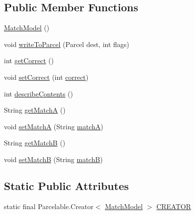 \subsection*{Public Member Functions}
\begin{DoxyCompactItemize}
\item 
\hyperlink{classorg_1_1buildmlearn_1_1matchtemplate_1_1data_1_1MatchModel_a924aa9108269f905b49e1062c271a757}{Match\+Model} ()
\item 
void \hyperlink{classorg_1_1buildmlearn_1_1matchtemplate_1_1data_1_1MatchModel_a55e6b262f93f6feee4596b56d324976b}{write\+To\+Parcel} (Parcel dest, int flags)
\item 
int \hyperlink{classorg_1_1buildmlearn_1_1matchtemplate_1_1data_1_1MatchModel_a46b17ddb418c16a7450d8ccfa88325f1}{get\+Correct} ()
\item 
void \hyperlink{classorg_1_1buildmlearn_1_1matchtemplate_1_1data_1_1MatchModel_a52e181ce05dffffc6b9224198e1492d9}{set\+Correct} (int \hyperlink{classorg_1_1buildmlearn_1_1matchtemplate_1_1data_1_1MatchModel_a07f7b7267534eed3e8214185f830e1ed}{correct})
\item 
int \hyperlink{classorg_1_1buildmlearn_1_1matchtemplate_1_1data_1_1MatchModel_a1e90e9e32c694cae089ba12eb6acd47f}{describe\+Contents} ()
\item 
String \hyperlink{classorg_1_1buildmlearn_1_1matchtemplate_1_1data_1_1MatchModel_a4370a8e2bd7bb6af3231264301b4ec4e}{get\+MatchA} ()
\item 
void \hyperlink{classorg_1_1buildmlearn_1_1matchtemplate_1_1data_1_1MatchModel_af0997bf65f3061f3eadcad6e886f3a02}{set\+MatchA} (String \hyperlink{classorg_1_1buildmlearn_1_1matchtemplate_1_1data_1_1MatchModel_afa38921fe539b779c21cc5247d1386c1}{matchA})
\item 
String \hyperlink{classorg_1_1buildmlearn_1_1matchtemplate_1_1data_1_1MatchModel_a61caa30f87ada8ce937bcce5a5d37790}{get\+MatchB} ()
\item 
void \hyperlink{classorg_1_1buildmlearn_1_1matchtemplate_1_1data_1_1MatchModel_a4555f820b1787c286983fa64a0692874}{set\+MatchB} (String \hyperlink{classorg_1_1buildmlearn_1_1matchtemplate_1_1data_1_1MatchModel_a1a2f1713037995453966d237102d0554}{matchB})
\end{DoxyCompactItemize}
\subsection*{Static Public Attributes}
\begin{DoxyCompactItemize}
\item 
static final Parcelable.\+Creator$<$ \hyperlink{classorg_1_1buildmlearn_1_1matchtemplate_1_1data_1_1MatchModel}{Match\+Model} $>$ \hyperlink{classorg_1_1buildmlearn_1_1matchtemplate_1_1data_1_1MatchModel_aa72afb928570b756c70703b957c54ed1}{C\+R\+E\+A\+T\+OR}
\end{DoxyCompactItemize}
